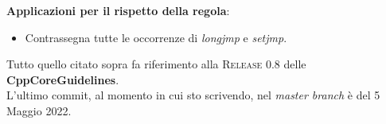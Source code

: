\textsf{\small \textbf{Applicazioni per il rispetto della regola}: }

\begin{itemize}
	\item \textsf{\small Contrassegna tutte le occorrenze di \emph{longjmp} e \emph{setjmp}.}
\end{itemize}

\break

\fleuron

\textsf{\small Tutto quello citato sopra fa riferimento alla \textsc{Release 0.8} delle \textbf{CppCoreGuidelines}.} \\
\textsf{\small L'ultimo commit, al momento in cui sto scrivendo, nel \emph{master branch} è del 5 Maggio 2022.} \\ %